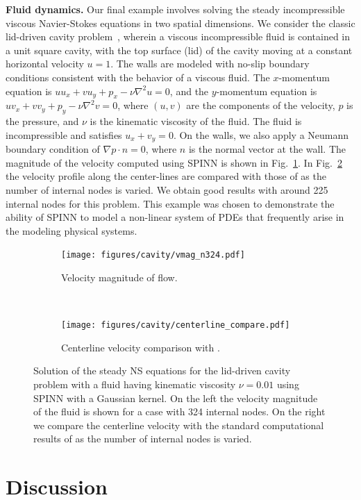 \documentclass[12pt]{article}
\begin{document}
\textbf{Fluid dynamics.}
Our final example involves solving the steady incompressible viscous Navier-Stokes equations in two spatial dimensions.  We consider the classic lid-driven cavity problem~\cite{ldc:ghia}, wherein a viscous incompressible fluid is contained in a unit square cavity, with the top surface (lid) of the cavity moving at a constant horizontal velocity $u=1$.   The walls are modeled with no-slip boundary conditions consistent with the behavior of a viscous fluid.  The $x$-momentum equation is $u u_x + v u_y + p_x - \nu \nabla^2 u = 0$, and the $y$-momentum equation is $u v_x + v v_y + p_y - \nu \nabla^2 v = 0$, where $(u, v)$ are the components of the velocity,  $p$ is the  pressure, and $\nu$ is the kinematic viscosity of the fluid. The fluid is incompressible and satisfies $u_x + v_y = 0$.  On the walls, we also apply a Neumann boundary condition of $\nabla p \cdot n = 0$, where $n$ is the normal vector at the wall. The magnitude of the velocity computed using SPINN is shown in Fig.~\ref{fig:ldc_velocity}.  In Fig.~\ref{fig:ldc_ghia_compare} the velocity profile along the center-lines are compared with those of \cite{ldc:ghia} as the number of internal nodes is varied.  We obtain good results with around 225 internal nodes for this problem.  This example was chosen to demonstrate the ability of SPINN to model a non-linear system of PDEs that frequently arise in the modeling physical systems.

\begin{figure}
\begin{subfigure}{0.51\textwidth}
\texttt{[image: figures/cavity/vmag\_n324.pdf]}
\caption{Velocity magnitude of flow.}
\label{fig:ldc_velocity}
\end{subfigure}
~
\begin{subfigure}{0.49\textwidth}
\texttt{[image: figures/cavity/centerline\_compare.pdf]}
\caption{Centerline velocity comparison with \cite{ldc:ghia}.}
\label{fig:ldc_ghia_compare}
\end{subfigure}
\caption{Solution of the steady NS equations for the lid-driven cavity problem with a fluid having kinematic viscosity $\nu=0.01$ using SPINN with a Gaussian kernel. On the left the velocity magnitude of the fluid is shown for a case with 324 internal nodes.  On the right we compare the centerline velocity with the standard computational results of \cite{ldc:ghia} as the number of internal nodes is varied.}
\label{fig:ldc}
\end{figure}

\section*{Discussion}
\end{document}
